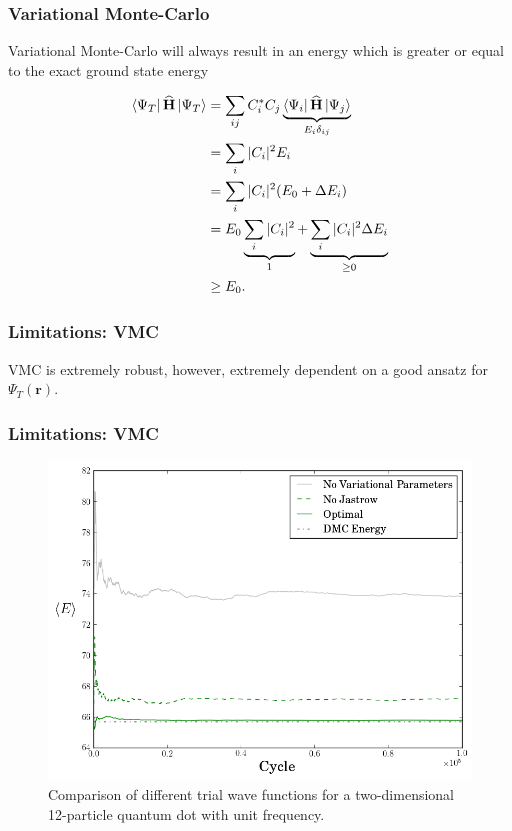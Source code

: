 \begin{frame}
 \frametitle{\textbf{Variational} Monte-Carlo}
 
 Variational Monte-Carlo will always result in an energy which is greater or equal to the exact ground state energy
 
 \begin{align*}
  \left< \Psi_T \right|{\bf\widehat{H}}\left| \Psi_T \right> &= \sum_{ij} C_i^\ast C_j \underbrace{\left< \Psi_i \right| {\bf\widehat{H}} \left| \Psi_j \right>}_{E_i\delta_{ij}} \\
                                 &= \sum_i |C_i|^2 E_i \\
                                 &= \sum_i |C_i|^2 (E_0 + \Delta E_i) \\
                                 &= E_0 \underbrace{\sum_i |C_i|^2}_{1} + \underbrace{\sum_i |C_i|^2\Delta E_i}_{\ge 0} \\
                                 &\ge E_0.
 \end{align*}
\end{frame}

\begin{frame}
 \frametitle{Limitations: VMC}
 
 VMC is extremely robust, however, extremely dependent on a good ansatz for $\Psi_T(\mathbf{r})$.
 
\end{frame}



\begin{frame}
 \frametitle{Limitations: VMC}
 
 \begin{figure}
  \begin{center}
   \includegraphics[scale=0.35]{../graphics/WFComp.png}
  \end{center}
  \caption{Comparison of different trial wave functions for a two-dimensional 12-particle quantum dot with unit frequency.}
 \end{figure}
 
\end{frame}

